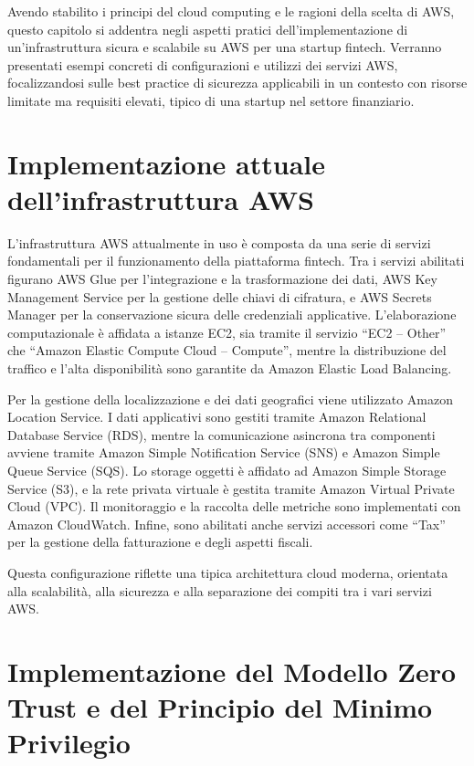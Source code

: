 Avendo stabilito i principi del cloud computing e le ragioni della scelta di AWS, questo capitolo si addentra negli aspetti pratici dell'implementazione di un'infrastruttura sicura e scalabile su AWS per una startup fintech. Verranno presentati esempi concreti di configurazioni e utilizzi dei servizi AWS, focalizzandosi sulle best practice di sicurezza applicabili in un contesto con risorse limitate ma requisiti elevati, tipico di una startup nel settore finanziario.

\section{Implementazione attuale dell'infrastruttura AWS} 
L'infrastruttura AWS attualmente in uso è composta da una serie di servizi fondamentali per il funzionamento della piattaforma fintech. Tra i servizi abilitati figurano AWS Glue per l'integrazione e la trasformazione dei dati, AWS Key Management Service per la gestione delle chiavi di cifratura, e AWS Secrets Manager per la conservazione sicura delle credenziali applicative. L’elaborazione computazionale è affidata a istanze EC2, sia tramite il servizio “EC2 – Other” che “Amazon Elastic Compute Cloud – Compute”, mentre la distribuzione del traffico e l'alta disponibilità sono garantite da Amazon Elastic Load Balancing.

Per la gestione della localizzazione e dei dati geografici viene utilizzato Amazon Location Service. I dati applicativi sono gestiti tramite Amazon Relational Database Service (RDS), mentre la comunicazione asincrona tra componenti avviene tramite Amazon Simple Notification Service (SNS) e Amazon Simple Queue Service (SQS). Lo storage oggetti è affidato ad Amazon Simple Storage Service (S3), e la rete privata virtuale è gestita tramite Amazon Virtual Private Cloud (VPC). Il monitoraggio e la raccolta delle metriche sono implementati con Amazon CloudWatch. Infine, sono abilitati anche servizi accessori come “Tax” per la gestione della fatturazione e degli aspetti fiscali.

Questa configurazione riflette una tipica architettura cloud moderna, orientata alla scalabilità, alla sicurezza e alla separazione dei compiti tra i vari servizi AWS.




\section{Implementazione del Modello Zero Trust e del Principio del Minimo Privilegio}
\label{sec:zero-trust-implementation}

